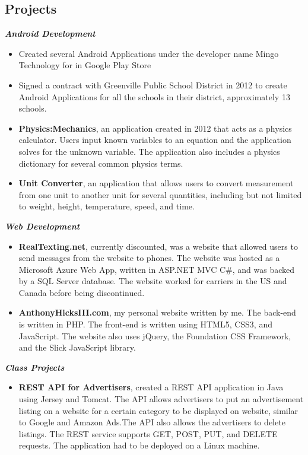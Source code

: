 \documentclass[10pt]{res}
\begin{document}
\begin{resume}
\section{Projects}
\textbf{\textit{Android Development}}
	\vspace*{.25em}
	\begin{itemize}
		\item Created several Android Applications under the developer name Mingo Technology for in Google Play Store
		\item Signed a contract with Greenville Public School District in 2012 to create Android Applications for all the schools in their district, approximately 13 schools. 
		\item \textbf{Physics:Mechanics}, an application created in 2012 that acts as a physics calculator. Users input known variables to an equation and the application solves for the unknown variable. The application also includes a physics dictionary for several common physics terms. 
		\item \textbf{Unit Converter}, an application that allows users to convert measurement from one unit to another unit for several quantities, including but not limited to weight, height, temperature, speed, and time. 
	\end{itemize} 
\textbf{\textit{Web Development}}
	\vspace*{.25em}
	\begin{itemize}
		\item \textbf{RealTexting.net}, currently discounted, was a website that allowed users to send messages from the website to phones. The website was hosted as a Microsoft Azure Web App, written in ASP.NET MVC C\#, and was backed by a SQL Server database. The website worked for carriers in the US and Canada before being discontinued. 
		\item \textbf{AnthonyHicksIII.com}, my personal website written by me. The back-end is written in PHP. The front-end is written using HTML5, CSS3, and JavaScript. The website also uses jQuery, the Foundation CSS Framework, and the Slick JavaScript library.
	\end{itemize}
\textbf{\textit{Class Projects}}
	\vspace*{.25em}
	\begin{itemize}
		\item \textbf{REST API for Advertisers}, created a REST API application in Java using Jersey and Tomcat. The API allows advertisers to put an advertisement listing on a website for a certain category to be displayed on website, similar to Google and Amazon Ads.The API also allows the advertisers to delete listings. The REST service supports GET, POST, PUT, and DELETE requests. The application had to be deployed on a Linux machine. 
	\end{itemize} 


\end{resume}
\end{document}
